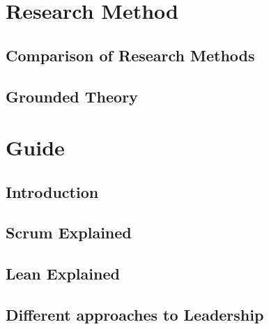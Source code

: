 



\frontmatter 

\cleardoublepage

\cleardoublepage

\cleardoublepage


\mainmatter



\part*{Research Method}

\chapter{Comparison of Research Methods}
\label{chap:CompareResearchMethod}


\chapter{Grounded Theory}
\label{chap:groundedTheory}


\part*{Guide}

\chapter{Introduction}
\label{chap:intro}


\chapter{Scrum Explained}
\label{chap:ScrumExplained}


\chapter{Lean Explained}
\label{chap:LeanExplained}


\chapter{Different approaches to Leadership}
\label{chap:LeadershipDifferences}


